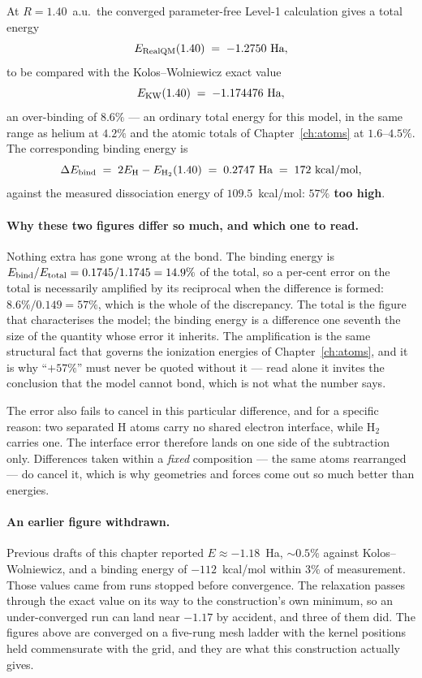 At $R = 1.40$~a.u.\ the converged parameter-free Level-1 calculation gives a total energy
\[
E_{\rm RealQM}(1.40) \;=\; -1.2750 \text{ Ha},
\]
to be compared with the Kolos--Wolniewicz exact value
\[
E_{\rm KW}(1.40) \;=\; -1.174476 \text{ Ha},
\]
an over-binding of $8.6\%$ --- an ordinary total energy for this model, in the same range as
helium at $4.2\%$ and the atomic totals of Chapter~\ref{ch:atoms} at $1.6$--$4.5\%$. The
corresponding binding energy is
\[
\Delta E_{\rm bind} \;=\; 2 E_{\rm H} - E_{\rm H_2}(1.40) \;=\; 0.2747 \text{ Ha}
\;=\; 172 \text{ kcal/mol},
\]
against the measured dissociation energy of $109.5$~kcal/mol: \textbf{$57\%$ too high}.

\paragraph{Why these two figures differ so much, and which one to read.}
Nothing extra has gone wrong at the bond. The binding energy is $E_{\rm bind}/E_{\rm total} =
0.1745/1.1745 = 14.9\%$ of the total, so a per-cent error on the total is necessarily amplified by
its reciprocal when the difference is formed: $8.6\%/0.149 = 57\%$, which is the whole of the
discrepancy. The total is the figure that characterises the model; the binding energy is a
difference one seventh the size of the quantity whose error it inherits. The amplification is the
same structural fact that governs the ionization energies of Chapter~\ref{ch:atoms}, and it is why
``$+57\%$'' must never be quoted without it --- read alone it invites the conclusion that the model
cannot bond, which is not what the number says.

The error also fails to cancel in this particular difference, and for a specific reason: two
separated H atoms carry no shared electron interface, while H$_2$ carries one. The interface error
therefore lands on one side of the subtraction only. Differences taken within a \emph{fixed}
composition --- the same atoms rearranged --- do cancel it, which is why geometries and forces come
out so much better than energies.

\paragraph{An earlier figure withdrawn.} Previous drafts of this chapter reported
$E \approx -1.18$~Ha, $\sim\!0.5\%$ against Kolos--Wolniewicz, and a binding energy of
$-112$~kcal/mol within $3\%$ of measurement. Those values came from runs stopped before
convergence. The relaxation passes through the exact value on its way to the construction's own
minimum, so an under-converged run can land near $-1.17$ by accident, and three of them did. The
figures above are converged on a five-rung mesh ladder with the kernel positions held commensurate
with the grid, and they are what this construction actually gives.

